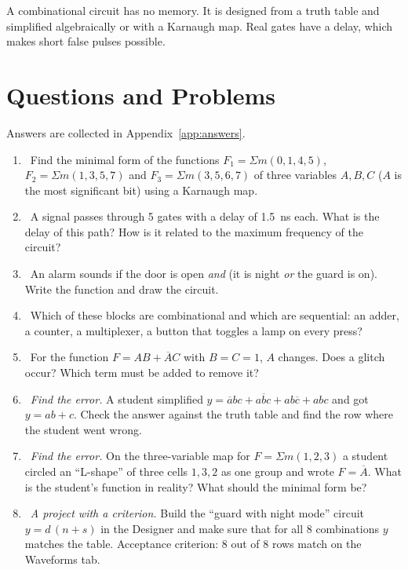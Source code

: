\begin{ideabox}
A combinational circuit has no memory. It is designed from a truth table and
simplified algebraically or with a Karnaugh map. Real gates have a delay,
which makes short false pulses possible.
\end{ideabox}

\section{Questions and Problems}
\label{sec:tasks-comb}

Answers are collected in Appendix~\ref{app:answers}.

\begin{taskbox}
\begin{enumerate}
  \item {}~Find the minimal form of the functions $F_1=\Sigma m(0,1,4,5)$, $F_2=\Sigma m(1,3,5,7)$ and $F_3=\Sigma m(3,5,6,7)$ of three variables $A,B,C$ ($A$ is the most significant bit) using a Karnaugh map.
  \item {}~A signal passes through 5 gates with a delay of 1.5~ns each. What is the delay of this path? How is it related to the maximum frequency of the circuit?
  \item {}~An alarm sounds if the door is open \emph{and} (it is night \emph{or} the guard is on). Write the function and draw the circuit.
  \item {}~Which of these blocks are combinational and which are sequential: an adder, a counter, a multiplexer, a button that toggles a lamp on every press?
  \item {}~For the function $F = AB + \overline{A}C$ with $B=C=1$, $A$ changes. Does a glitch occur? Which term must be added to remove it?
  \item {}~\emph{Find the error.} A student simplified $y=\overline{a}bc+a\overline{b}c+ab\overline{c}+abc$ and got $y=ab+c$. Check the answer against the truth table and find the row where the student went wrong.
  \item {}~\emph{Find the error.} On the three-variable map for $F=\Sigma m(1,2,3)$ a student circled an ``L-shape'' of three cells $1,3,2$ as one group and wrote $F=\overline{A}$. What is the student's function in reality? What should the minimal form be?
  \item {}~\emph{A project with a criterion.} Build the ``guard with night mode'' circuit $y=d\,(n+s)$ in the Designer and make sure that for all 8 combinations $y$ matches the table. Acceptance criterion: 8 out of 8 rows match on the Waveforms tab.

\end{enumerate}
\end{taskbox}
